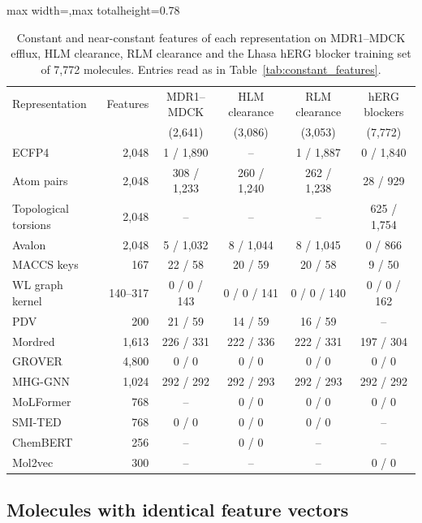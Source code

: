 \begin{table}[htbp]
\centering
\small
\setlength{\tabcolsep}{4pt}
\begin{adjustbox}{max width=\textwidth,max totalheight=0.78\textheight}
\begin{tabular}{lrcccc}
\toprule
Representation & Features & MDR1--MDCK & HLM clearance & RLM clearance & hERG blockers \\
 & & (2,641) & (3,086) & (3,053) & (7,772) \\
\midrule
ECFP4 & 2,048 & 1 / 1,890 & -- & 1 / 1,887 & 0 / 1,840 \\
Atom pairs & 2,048 & 308 / 1,233 & 260 / 1,240 & 262 / 1,238 & 28 / 929 \\
Topological torsions & 2,048 & -- & -- & -- & 625 / 1,754 \\
Avalon & 2,048 & 5 / 1,032 & 8 / 1,044 & 8 / 1,045 & 0 / 866 \\
MACCS keys & 167 & 22 / 58 & 20 / 59 & 20 / 58 & 9 / 50 \\
WL graph kernel & 140--317 & 0 / 0 / 143 & 0 / 0 / 141 & 0 / 0 / 140 & 0 / 0 / 162 \\
PDV & 200 & 21 / 59 & 14 / 59 & 16 / 59 & -- \\
Mordred & 1,613 & 226 / 331 & 222 / 336 & 222 / 331 & 197 / 304 \\
GROVER & 4,800 & 0 / 0 & 0 / 0 & 0 / 0 & 0 / 0 \\
MHG-GNN & 1,024 & 292 / 292 & 292 / 293 & 292 / 293 & 292 / 292 \\
MoLFormer & 768 & -- & 0 / 0 & 0 / 0 & 0 / 0 \\
SMI-TED & 768 & 0 / 0 & 0 / 0 & 0 / 0 & -- \\
ChemBERT & 256 & -- & 0 / 0 & -- & -- \\
Mol2vec & 300 & -- & -- & -- & 0 / 0 \\
\bottomrule
\end{tabular}
\end{adjustbox}
\caption[Constant and near-constant features per representation, part 2.]{Constant and near-constant features of each representation on MDR1--MDCK efflux, HLM clearance, RLM clearance and the Lhasa hERG blocker training set of 7,772 molecules. Entries read as in Table~\ref{tab:constant_features}.}
\label{tab:constant_features_b}
\end{table}

\subsection{Molecules with identical feature vectors}

